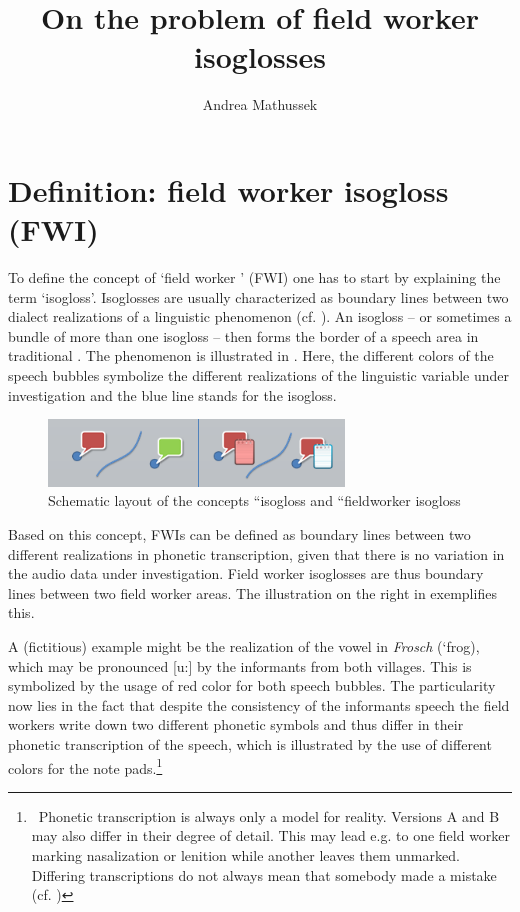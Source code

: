 \documentclass[output=paper]{LSP/langsci}
\author{Andrea Mathussek\affiliation{University of Freiburg}}
\title{On the problem of field worker isoglosses}
\begin{document}
\section{Definition: field worker isogloss (FWI)}
To define the concept of `field worker ' (FWI) one has to start by explaining the term `isogloss'. Isoglosses are usually characterized as boundary lines between two dialect realizations of a linguistic phenomenon (cf. \citealt[296--297]{gluck_metzler_2005}). An isogloss – or sometimes a bundle of more than one isogloss – then forms the border of a speech area in traditional . The phenomenon is illustrated in . Here, the different colors of the speech bubbles symbolize the different realizations of the linguistic variable under investigation and the blue line stands for the isogloss.

\begin{figure}
\includegraphics[width=0.7\textwidth]{illustrations/mathus_fig1}
\caption{Schematic layout of the concepts ``isogloss{\textquotedbl} and ``fieldworker isogloss{\textquotedbl}}
\label{fig:1}
\end{figure}

Based on this concept, FWIs can be defined as boundary lines between two different realizations in phonetic transcription, given that there is no variation in the audio data under investigation. Field worker isoglosses are thus boundary lines between two field worker areas. The illustration on the right in  exemplifies this.

A (fictitious) example might be the realization of the vowel in \textit{Frosch} (`frog{\textquotesingle}), which may be pronounced [u:] by the informants from both villages. This is symbolized by the usage of red color for both speech bubbles. The particularity now lies in the fact that despite the consistency of the informants{\textquotesingle} speech the field workers write down two different phonetic symbols and thus differ in their phonetic transcription of the speech, which is illustrated by the use of different colors for the note pads.\footnote{\ Phonetic transcription is always only a model for reality. Versions A and B may also differ in their degree of detail. This may lead e.g. to one field worker marking nasalization or lenition while another leaves them unmarked. Differing transcriptions do not always mean that somebody made a mistake (cf. \citealt[41--69]{mathussek_sprachraume_2014})} 
\end{document}
